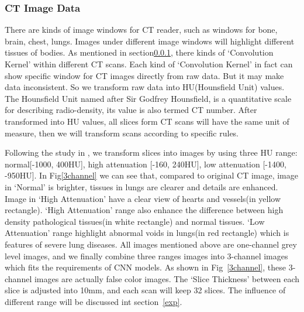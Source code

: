 \documentclass[runningheads]{llncs}
\begin{document}
\subsubsection{CT Image Data}
\label{ctimagedata}
There are kinds of image windows for CT reader, such as windows for bone, brain, chest, lungs. Images under different image windows will highlight different tissues of bodies.
As mentioned in section\ref{ctimagedata}, there kinds of `Convolution Kernel' within different CT scans. Each kind of `Convolution Kernel' in fact can show specific window for CT images directly from raw data. But it may make data inconsistent. So we transform raw data into HU(Hounsfield Unit) values. The Hounsfield Unit named after Sir Godfrey Hounsfield, is a quantitative scale for describing radio-density, its value is also termed CT number. After transformed into HU values, all slices form CT scans will have the same unit of measure, then we will transform scans according to specific rules.

Following the study in \cite{Shin2017Three} \cite{gao2018holistic}, we transform slices into images by using three HU range: normal[-1000, 400HU], high attenuation [-160, 240HU], low attenuation [-1400, -950HU]. In Fig\ref{3channel} we can see that, compared to original CT image, image in `Normal' is brighter, tissues in lungs are clearer and details are enhanced. Image in `High Attenuation' have a clear view of hearts and vessels(in yellow rectangle). `High Attenuation' range also enhance the difference between high density pathological tissues(in white rectangle) and normal tissues. `Low Attenuation' range highlight abnormal voids in lungs(in red rectangle) which is features of severe lung diseases. All images mentioned above are one-channel grey level images, and we finally combine three ranges images into 3-channel images which fits the requirements of CNN models. As shown in Fig~\ref{3channel}, these 3-channel images are actually false color images. The `Slice Thickness' between each slice is adjusted into 10mm, and each scan will keep 32 slices.
The influence of different range will be discussed int section~\ref{exp}.
\end{document}
